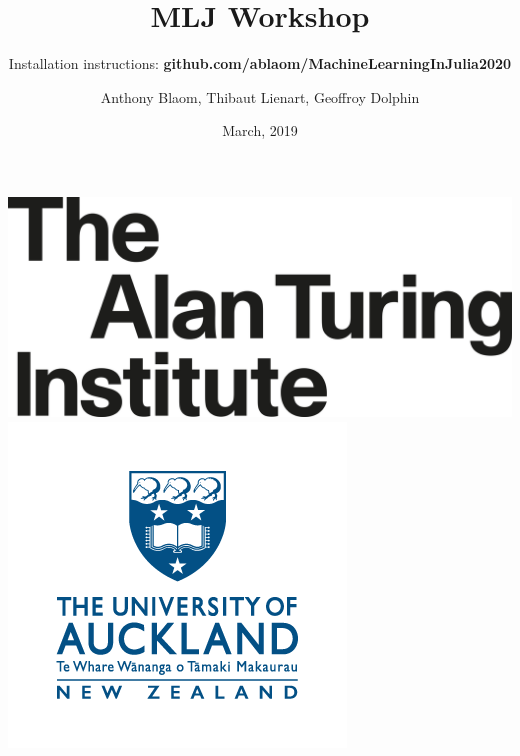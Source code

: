 \documentclass[t]{beamer}
\title{\color{Maroon} MLJ Workshop}
\subtitle{{\small Installation instructions: \bfseries{github.com/ablaom/MachineLearningInJulia2020}}}
\date{March, 2019}
\author{Anthony Blaom, Thibaut Lienart, Geoffroy Dolphin}
\newcommand\df{\bf\color{Maroon}}
\begin{document}



\begin{frame}
	\titlepage
\end{frame}

\begin{frame}
  \vspace{0\baselineskip}
  \begin{center}
    \includegraphics[scale=0.2]{Turing_logo.png}
    \includegraphics[scale=0.35]{UoA_logo.png}
    

\end{center}
\end{frame}
\end{document}
